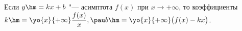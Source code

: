 
  Если $y\hm=kx+b$ "--- асимптота $f(x)$ при $x\to+\infty$, то коэффициенты $k\hm=\yo{x}{+\infty}\dfrac{f(x)}x,\pau b\hm=\yo{x}{+\infty}\big(f(x)-kx\big)$.
